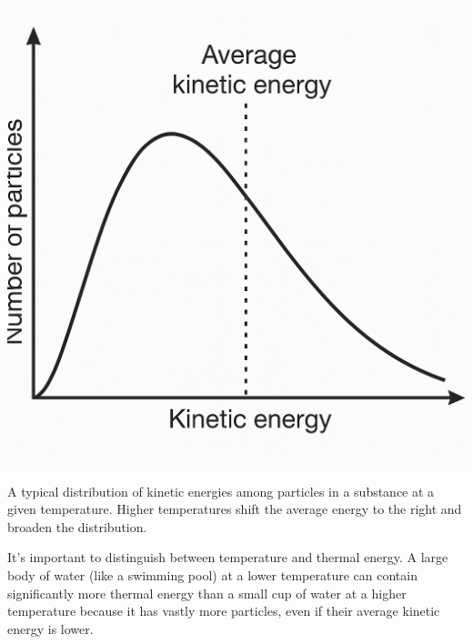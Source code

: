 
\begin{marginfigure}[-20pt] %
\includegraphics[width=\linewidth]{kinetic_energy.png} %
\caption{A typical distribution of kinetic energies among particles in a substance at a given temperature. Higher temperatures shift the average energy to the right and broaden the distribution.}
\label{fig:particle_distribution}
\end{marginfigure}

It's important to distinguish between temperature and thermal energy. A large body of water (like a swimming pool) at a lower temperature can contain significantly more thermal energy than a small cup of water at a higher temperature because it has vastly more particles, even if their average kinetic energy is lower.

